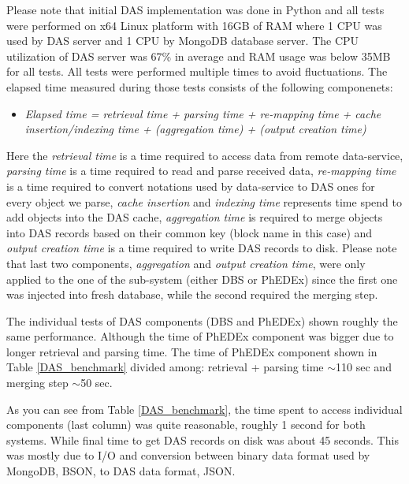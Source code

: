 \documentclass[a4paper]{jpconf}
\begin{document}
Please note that initial DAS implementation was done in Python \cite{Python}
and all tests were performed on x64 Linux platform with 16GB of RAM where
1 CPU was used by DAS server and 1 CPU by MongoDB database server. The CPU utilization
of DAS server was 67\% in average and RAM usage was below 35MB for
all tests. All tests were performed multiple times to avoid fluctuations. 
The elapsed time measured during those tests consists of the 
following componenets:
\begin{itemize}
\item[]
{\it
Elapsed time = retrieval time + parsing time + re-mapping time 
        + cache insertion/indexing time 
        + (aggregation time) + (output creation time)
}
\end{itemize}
Here the {\it retrieval time} is a time required to access data from remote data-service,
{\it parsing time} is a time required to read and parse received data, {\it re-mapping time}
is a time required to convert notations used by data-service to DAS ones for every object
we parse, {\it cache insertion} and {\it indexing time} represents time spend to add objects into
the DAS cache, {\it aggregation time} is required to merge objects into DAS records based
on their common key (block name in this case) and {\it output creation time}
is a time required to write DAS records to disk. Please note that last two
components, {\it aggregation} and {\it output creation time}, were only applied to
the one of the sub-system (either DBS or PhEDEx) since the first one was injected into
fresh database, while the second required the merging step.

%

The individual tests of DAS components (DBS and PhEDEx) shown roughly 
the same performance. Although the time of PhEDEx component was bigger 
due to longer retrieval and parsing time.
The time of PhEDEx component shown in Table \ref{DAS_benchmark} divided 
among: retrieval + parsing time $\sim$110 sec and merging step $\sim$50 sec.

As you can see from Table \ref{DAS_benchmark},
the time spent to access individual components (last column) was quite
reasonable, roughly 1 second for both systems. While final time to
get DAS records on disk was about 45 seconds. This was mostly due to I/O and
conversion between binary data format used by MongoDB, BSON, to DAS
data format, JSON.
\end{document}
